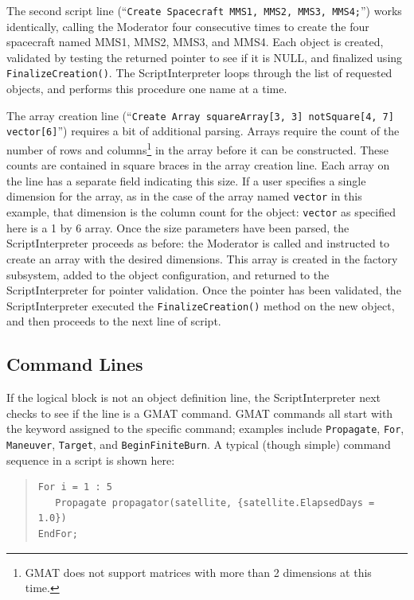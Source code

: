 The second script line (``\texttt{Create Spacecraft MMS1, MMS2, MMS3, MMS4;}'') works
identically, calling the Moderator four consecutive times to create the four spacecraft named MMS1,
MMS2, MMS3, and MMS4.  Each object is created, validated by testing the returned pointer to
see if it is NULL, and finalized using \texttt{FinalizeCreation()}.  The ScriptInterpreter loops
through the list of requested objects, and performs this procedure one name at a time.

The array creation line (``\texttt{Create Array squareArray[3, 3] notSquare[4, 7] vector[6]}'')
requires a bit of additional parsing.  Arrays require the count of the number of rows and
columns\footnote{GMAT does not support matrices with more than 2 dimensions at this time.} in
the array before it can be constructed.  These counts are contained in square braces in the array
creation line.  Each array on the line has a separate field indicating this size.  If a user
specifies a single dimension for the array, as in the case of the array named \texttt{vector} in
this example, that dimension is the column count for the object: \texttt{vector} as specified here
is a 1 by 6 array.  Once the size parameters have been parsed, the ScriptInterpreter proceeds as
before: the Moderator is called and instructed to create an array with the desired dimensions.  This
array is created in the factory subsystem, added to the object configuration, and returned to the
ScriptInterpreter for pointer validation.  Once the pointer has been validated, the
ScriptInterpreter executed the \texttt{FinalizeCreation()} method on the new object, and then
proceeds to the next line of script.

\subsection{\label{section:ParsingCommands}Command Lines}

If the logical block is not an object definition line, the ScriptInterpreter next checks to see if
the line is a GMAT command.  GMAT commands all start with the keyword assigned to the specific
command; examples include \texttt{Propagate}, \texttt{For}, \texttt{Maneuver}, \texttt{Target}, and
\texttt{BeginFiniteBurn}.  A typical (though simple) command sequence in a script is shown here:

\begin{quote}
\begin{verbatim}
For i = 1 : 5
   Propagate propagator(satellite, {satellite.ElapsedDays = 1.0})
EndFor;
\end{verbatim}
\end{quote}

